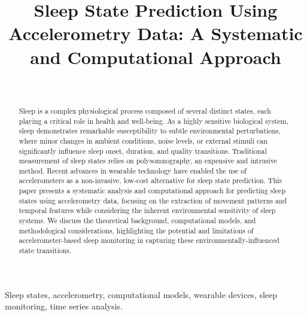 \documentclass[conference]{IEEEtran}
\begin{document}
\title{Sleep State Prediction Using Accelerometry Data: A Systematic and Computational Approach}

\author{
	\\
	\and
}

\maketitle

\begin{abstract}
	Sleep is a complex physiological process composed of several distinct states, each playing a critical role in health and well-being. As a highly sensitive biological system, sleep demonstrates remarkable susceptibility to subtle environmental perturbations, where minor changes in ambient conditions, noise levels, or external stimuli can significantly influence sleep onset, duration, and quality transitions. Traditional measurement of sleep states relies on polysomnography, an expensive and intrusive method. Recent advances in wearable technology have enabled the use of accelerometers as a non-invasive, low-cost alternative for sleep state prediction. This paper presents a systematic analysis and computational approach for predicting sleep states using accelerometry data, focusing on the extraction of movement patterns and temporal features while considering the inherent environmental sensitivity of sleep systems. We discuss the theoretical background, computational models, and methodological considerations, highlighting the potential and limitations of accelerometer-based sleep monitoring in capturing these environmentally-influenced state transitions.
\end{abstract}

\begin{IEEEkeywords}
	Sleep states, accelerometry, computational models, wearable devices, sleep monitoring, time series analysis.
\end{IEEEkeywords}
\end{document}
